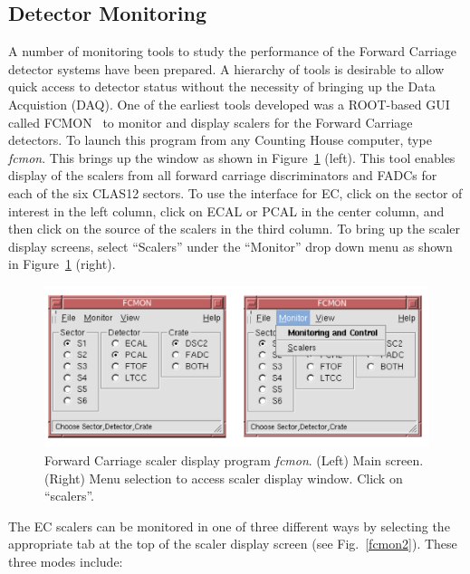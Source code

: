\documentclass[letterpaper,10pt]{article}
\begin{document}
\vfil
\eject

\subsection{Detector Monitoring}
\label{monitoring}

A number of monitoring tools to study the performance of the Forward Carriage detector systems
have been prepared. A hierarchy of tools is desirable to allow quick access to detector status
without the necessity of bringing up the Data Acquistion (DAQ).  One of the earliest tools developed
was a ROOT-based GUI called FCMON~\cite{fcmon} to monitor and display scalers for the
Forward Carriage detectors.  To launch this program from any Counting House computer, type {\it fcmon}.
This brings up the window as shown in Figure~\ref{fcmon1} (left). This tool enables display of
the scalers from all forward carriage discriminators and FADCs for each of the six CLAS12 sectors. To
use the interface for EC, click on the sector of interest in the left column, click on ECAL or PCAL in
the center column, and then click on the source of the scalers in the third column. To bring
up the scaler display screens, select ``Scalers'' under the ``Monitor'' drop down menu as
shown in Figure~\ref{fcmon1} (right).
 
\begin{figure}[htbp]
  \centering
  \includegraphics[width= 6in, keepaspectratio = true]{fcmon-1}
  \vspace{2mm}
  \caption{Forward Carriage scaler display program {\it fcmon}. (Left) Main screen. (Right) Menu selection to
    access scaler display window.  Click on ``scalers''.}
\label{fcmon1}
\end{figure}

The EC scalers can be monitored in one of three different ways by selecting the appropriate tab
at the top of the scaler display screen (see Fig.~\ref{fcmon2}). These three modes include:
\end{document}
